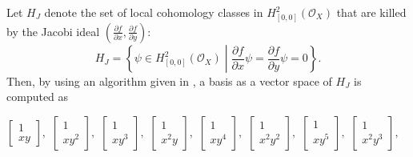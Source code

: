 \documentclass[pdftex]{arxsigma}
\begin{document}
\begin{remark*}
Let $H_J $ denote the set of local cohomology classes in $ H_{[0,0]}^{2}({\mathcal O}_{X}) $ that are killed by the Jacobi ideal $  (\frac{\partial f}{\partial x}, \frac{\partial f}{\partial y}) : $
\begin{equation*}
H_J = \left\{ \psi \in  H_{[0,0]}^{2}({\mathcal O}_{X}) \middle|   \frac{\partial f}{\partial x}\psi = \frac{\partial f}{\partial y}\psi = 0 \right\}. 
\end{equation*}
Then, by using an algorithm given in \cite{NT17a,TNN}, a basis as a vector space of $H_J$ is computed as 

\vspace{1ex}
\noindent
$\left[ \begin{array}{c} 1 \\ x  y \end{array} \right] , $ $\left[ \begin{array}{c} 1 \\ x  y^2 \end{array} \right] , $
$\left[ \begin{array}{c} 1 \\ x  y^3 \end{array} \right] , $ $\left[ \begin{array}{c} 1 \\ x^2  y \end{array} \right] , $
$\left[ \begin{array}{c} 1 \\ x  y^4 \end{array} \right] , $ $\left[ \begin{array}{c} 1 \\ x^2  y^2 \end{array} \right] , $ 
$\left[ \begin{array}{c} 1 \\ x  y^5 \end{array} \right] , $ $\left[ \begin{array}{c} 1 \\ x^2  y^3 \end{array} \right] , $


\end{remark*}
\end{document}
